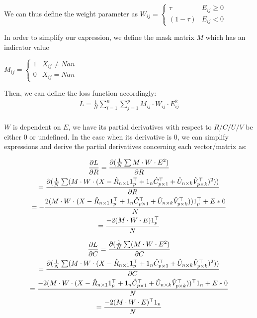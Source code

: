 \documentclass{article}
\begin{document}
We can thus define the weight parameter as $W_{ij} = \begin{cases}
    \tau & E_{ij} \geq 0\\
    (1 - \tau) & E_{ij} < 0
\end{cases}$

In order to simplify our expression, we define the mask matrix $M$ which has an indicator value 
\begin{center}
    $M_{ij} = \begin{cases}
    1 & X_{ij} \neq Nan\\
    0 & X_{ij} = Nan
\end{cases}$
\end{center}

Then, we can define the loss function accordingly:
\begin{gather*}
    L = \displaystyle\frac{1}{N}\sum_{i = 1}^{n}\sum_{j = 1}^{p} M_{ij} \cdot W_{ij} \cdot E_{ij}^2\\
\end{gather*}

$W$ is dependent on $E$, we have its partial derivatives with respect to $R/C/U/V$ be either 0 or undefined. In the case when its derivative is $0$, we can simplify expressions and derive the partial derivatives concerning each vector/matrix as:

\begin{gather*}
    \pdv{L}{R} = \pdv{(\frac{1}{N}\sum M \cdot W \cdot E^2)}{R} \\
    = \pdv{(\frac{1}{N}\sum(M \cdot W \cdot (X - \hat{R}_{n \times 1}1^{\top}_{p} + 1_{n}\hat{C}_{p \times 1}^{\top} + \hat{U}_{n \times k}\hat{V}^{\top}_{p \times k})^2))}{R}\\
    = -\frac{2(M \cdot W \cdot (X - \hat{R}_{n \times 1}1^{\top}_{p} + 1_{n}\hat{C}_{p \times 1}^{\top} + \hat{U}_{n \times k}\hat{V}^{\top}_{p \times k}))1^{\top}_{p} + E * 0} {N}\\
    = \frac{-2(M \cdot W \cdot E)1_{p}^\top}{N}
\end{gather*}

\begin{gather*}
    \pdv{L}{C} = \pdv{(\frac{1}{N}\sum(M \cdot W \cdot E^2)}{C} \\
    = \pdv{(\frac{1}{N}\sum(M \cdot W \cdot (X - \hat{R}_{n \times 1}1^{\top}_{p} + 1_{n}\hat{C}_{p \times 1}^{\top} + \hat{U}_{n \times k}\hat{V}^{\top}_{p \times k})^2))}{C}\\
    = \frac{-2(M \cdot W \cdot (X - \hat{R}_{n \times 1}1^{\top}_{p} + 1_{n}\hat{C}_{p \times 1}^{\top} + \hat{U}_{n \times k}\hat{V}^{\top}_{p \times k}))^\top1_{n} + E * 0}{N}\\
    = \frac{-2(M \cdot W \cdot E)^\top1_{n}}{N}
\end{gather*}
\end{document}
